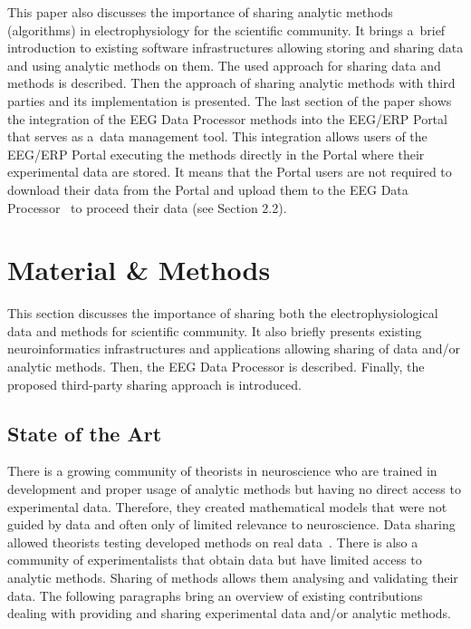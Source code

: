 \documentclass{frontiersSCNS} %
\begin{document}
This paper also discusses the importance of sharing analytic methods (algorithms) in electrophysiology for the scientific community. It brings a~brief introduction to existing software infrastructures allowing storing and sharing data and using analytic methods on them. The used approach for sharing data and methods is described. Then the approach of sharing analytic methods with third parties and its implementation is presented. The last section of the paper shows the integration of the EEG Data Processor methods into the EEG/ERP Portal that serves as a~data management tool. This integration allows users of the EEG/ERP Portal executing the methods directly in the Portal where their experimental data are stored. It means that the Portal users are not required to download their data from the Portal and upload them to the EEG Data Processor~\cite{Jezek13} to proceed their data (see Section 2.2).

\section{Material \& Methods}

This section discusses the importance of sharing both the electrophysiological data and methods for scientific community. It also briefly presents existing neuroinformatics infrastructures and applications allowing sharing of data and/or analytic methods. Then, the EEG Data Processor is described. Finally, the proposed third-party sharing approach is introduced.


\subsection{State of the Art}
There is a growing community of theorists in neuroscience who are trained in development and proper usage of analytic methods but having no direct access to experimental data. Therefore, they created mathematical models that were not guided by data and often only of limited relevance to neuroscience. Data sharing allowed theorists testing developed methods on real data~\cite{Tetters08}. There is also a community of experimentalists that obtain data but have limited access to analytic methods. Sharing of methods allows them analysing and validating their data. The following paragraphs bring an overview of existing contributions dealing with providing and sharing experimental data and/or analytic methods.
\end{document}

